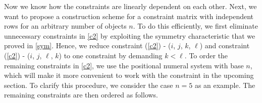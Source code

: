 Now we know how the constraints are linearly dependent on each other. Next, we want to propose a construction scheme for a constraint matrix with independent rows for an arbitrary number of objects $n$. To do this efficiently, we first eliminate unnecessary constraints in \ref{c2} by exploiting the symmetry characteristic that we proved in \ref{sym}. Hence, we reduce constraint (\ref{c2}) - ($i$, $j$, $k$, $\ell$) and constraint (\ref{c2}) - ($i$, $j$, $\ell$, $k$) to one constraint by demanding $k<\ell$. To order the remaining constraints in \ref{c2}, we use the positional numeral system with base $n$, which will make it more convenient to work with the constraint in the upcoming section. To clarify this procedure, we consider the case $n=5$ as an example. The remaining constraints are then ordered as follows.
\vspace{25 pt}
